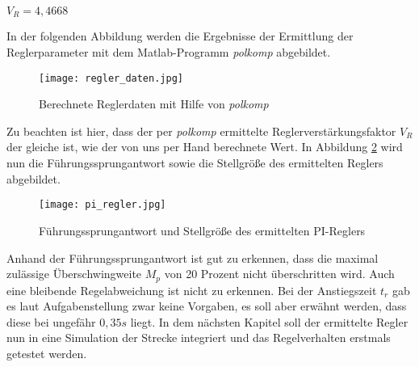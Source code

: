 \begin{center}
$V_{R}=4,4668$
\end{center}

In der folgenden Abbildung werden die Ergebnisse der Ermittlung der Reglerparameter mit dem Matlab-Programm \textit{polkomp} abgebildet.

\newpage

\begin{figure}[h]
	\begin{center}
		\texttt{[image: regler\_daten.jpg]}
		\caption{Berechnete Reglerdaten mit Hilfe von \textit{polkomp}}
       \label{controllerData}
	\end{center} 
\end{figure}

Zu beachten ist hier, dass der per \textit{polkomp} ermittelte Reglerverstärkungsfaktor $V_{R}$ der gleiche ist, wie der von uns per Hand berechnete Wert. In Abbildung \ref{controller} wird nun die Führungssprungantwort sowie die Stellgröße des ermittelten Reglers abgebildet.

\newpage

\begin{figure}[h]
	\begin{center}
		\texttt{[image: pi\_regler.jpg]}
		\caption{Führungssprungantwort und Stellgröße des ermittelten PI-Reglers}
       \label{controller}
	\end{center} 
\end{figure}

Anhand der Führungssprungantwort ist gut zu erkennen, dass die maximal zulässige Überschwingweite $M_{p}$ von 20 Prozent nicht überschritten wird. Auch eine bleibende Regelabweichung ist nicht zu erkennen. Bei der Anstiegszeit $t_{r}$ gab es laut Aufgabenstellung zwar keine Vorgaben, es soll aber erwähnt werden, dass diese bei ungefähr $0,35s$ liegt. In dem nächsten Kapitel soll der ermittelte Regler nun in eine Simulation der Strecke integriert und das Regelverhalten erstmals getestet werden.


















